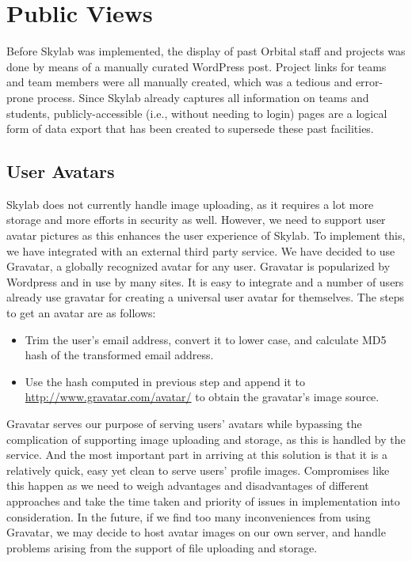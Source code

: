 \chapter{Public Views} \label{publicprofile}

Before Skylab was implemented, the display of past Orbital staff and projects was done by means of a manually curated WordPress post.   Project links for teams and team members were all manually created, which was a tedious and error-prone process. Since Skylab already captures all information on teams and students, publicly-accessible (i.e., without needing to login) pages are a logical form of data export that has been created to supersede these past facilities.

\section{User Avatars} \label{useravatar}

Skylab does not currently handle image uploading, as it requires a lot more storage and more efforts in security as well. However, we need to support user avatar pictures as this enhances the user experience of Skylab.  To implement this, we have integrated with an external third party service.   We have decided to use Gravatar, a globally recognized avatar for any user\cite{citationgravatar}. Gravatar is popularized by Wordpress and in use by many sites.  It is easy to integrate and a number of users already use gravatar for creating a universal user avatar for themselves.  The steps to get an avatar are as follows:

\begin{itemize}
  \item Trim the user's email address, convert it to lower case, and calculate MD5 hash of the transformed email address.
  \item Use the hash computed in previous step and append it to \url{http://www.gravatar.com/avatar/} to obtain the gravatar's image source.
\end{itemize}

Gravatar serves our purpose of serving users' avatars while bypassing the complication of supporting image uploading and storage, as this is handled by the service. And the most important part in arriving at this solution is that it is a relatively quick, easy yet clean to serve users' profile images. Compromises like this happen as we need to weigh advantages and disadvantages of different approaches and take the time taken and priority of issues in implementation into consideration. In the future, if we find too many inconveniences from using Gravatar, we may decide to host avatar images on our own server, and handle problems arising from the support of file uploading and storage.
